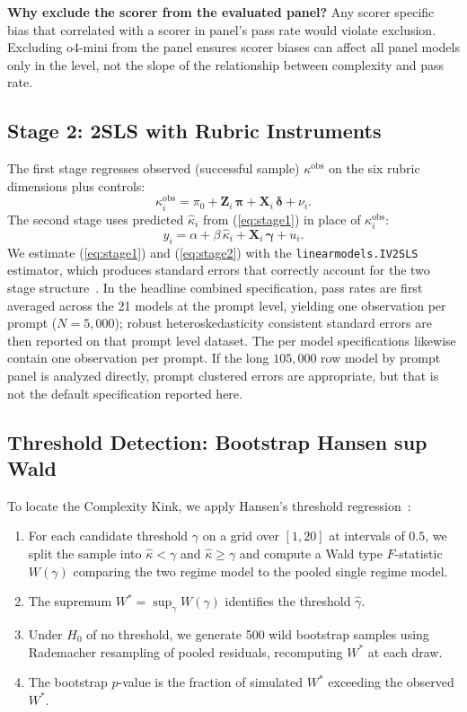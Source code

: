 \documentclass[conference]{IEEEtran}
\begin{document}
\textbf{Why exclude the scorer from the evaluated panel?} Any scorer specific bias that correlated with a scorer in panel's pass rate would violate exclusion. Excluding o4-mini from the panel ensures scorer biases can affect all panel models only in the level, not the slope of the relationship between complexity and pass rate.

\subsection{Stage 2: 2SLS with Rubric Instruments}
The first stage regresses observed (successful sample) $\kappa^{\text{obs}}$ on the six rubric dimensions plus controls:
\begin{equation}
\kappa_i^{\text{obs}} = \pi_0 + \mathbf{Z}_i\,\boldsymbol{\pi} + \mathbf{X}_i\,\boldsymbol{\delta} + \nu_i.
\label{eq:stage1}
\end{equation}
The second stage uses predicted $\hat{\kappa}_i$ from (\ref{eq:stage1}) in place of $\kappa_i^{\text{obs}}$:
\begin{equation}
y_i = \alpha + \beta\,\hat{\kappa}_i + \mathbf{X}_i\,\boldsymbol{\gamma} + u_i.
\label{eq:stage2}
\end{equation}
We estimate (\ref{eq:stage1}) and (\ref{eq:stage2}) with the \texttt{linearmodels.IV2SLS} estimator, which produces standard errors that correctly account for the two stage structure~\cite{wooldridge2010econometric}. In the headline combined specification, pass rates are first averaged across the 21 models at the prompt level, yielding one observation per prompt ($N=5{,}000$); robust heteroskedasticity consistent standard errors are then reported on that prompt level dataset. The per model specifications likewise contain one observation per prompt. If the long $105{,}000$ row model by prompt panel is analyzed directly, prompt clustered errors are appropriate, but that is not the default specification reported here.

\subsection{Threshold Detection: Bootstrap Hansen sup Wald}
To locate the Complexity Kink, we apply Hansen's threshold regression~\cite{hansen2000sample}:
\begin{enumerate}
\item For each candidate threshold $\gamma$ on a grid over $[1, 20]$ at intervals of $0.5$, we split the sample into $\hat{\kappa}<\gamma$ and $\hat{\kappa}\geq\gamma$ and compute a Wald type $F$-statistic $W(\gamma)$ comparing the two regime model to the pooled single regime model.
\item The supremum $W^* = \sup_\gamma W(\gamma)$ identifies the threshold $\hat{\gamma}$.
\item Under $H_0$ of no threshold, we generate 500 wild bootstrap samples using Rademacher resampling of pooled residuals, recomputing $W^*$ at each draw.
\item The bootstrap $p$-value is the fraction of simulated $W^*$ exceeding the observed $W^*$.
\end{enumerate}
\end{document}
